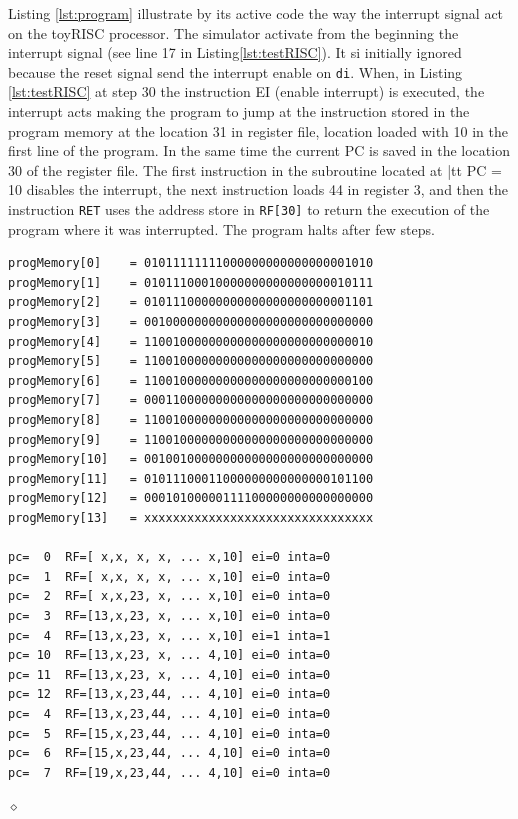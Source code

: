 \begin{exemplu}
Listing \ref{lst:program}  illustrate by its active code the way the interrupt signal act on the toyRISC processor. The simulator activate from the beginning the interrupt signal (see line 17 in Listing\ref{lst:testRISC}). It si initially ignored because the reset signal send  the interrupt enable on {\tt di}. When, in Listing \ref{lst:testRISC} at step 30 the instruction EI (enable interrupt) is executed, the interrupt acts making the program to jump at the instruction stored in the program memory at the location 31 in register file, location loaded with 10 in the first line of the program. In the same time the current PC is saved in the location 30 of the register file. The first instruction in the subroutine located at {|tt PC = 10} disables the interrupt, the next instruction  loads 44 in register 3, and then the instruction {\tt RET} uses the address store in {\tt RF[30]} to return the execution of the program where it was interrupted. The program halts after few steps.
{\small
\begin{verbatim}
progMemory[0]    = 01011111111000000000000000001010
progMemory[1]    = 01011100010000000000000000010111
progMemory[2]    = 01011100000000000000000000001101
progMemory[3]    = 00100000000000000000000000000000
progMemory[4]    = 11001000000000000000000000000010
progMemory[5]    = 11001000000000000000000000000000
progMemory[6]    = 11001000000000000000000000000100
progMemory[7]    = 00011000000000000000000000000000
progMemory[8]    = 11001000000000000000000000000000
progMemory[9]    = 11001000000000000000000000000000
progMemory[10] 	 = 00100100000000000000000000000000
progMemory[11] 	 = 01011100011000000000000000101100
progMemory[12] 	 = 00010100000111100000000000000000
progMemory[13] 	 = xxxxxxxxxxxxxxxxxxxxxxxxxxxxxxxx

pc=  0  RF=[ x,x, x, x, ... x,10] ei=0 inta=0
pc=  1  RF=[ x,x, x, x, ... x,10] ei=0 inta=0
pc=  2  RF=[ x,x,23, x, ... x,10] ei=0 inta=0
pc=  3  RF=[13,x,23, x, ... x,10] ei=0 inta=0
pc=  4  RF=[13,x,23, x, ... x,10] ei=1 inta=1
pc= 10  RF=[13,x,23, x, ... 4,10] ei=0 inta=0
pc= 11  RF=[13,x,23, x, ... 4,10] ei=0 inta=0
pc= 12  RF=[13,x,23,44, ... 4,10] ei=0 inta=0
pc=  4  RF=[13,x,23,44, ... 4,10] ei=0 inta=0
pc=  5  RF=[15,x,23,44, ... 4,10] ei=0 inta=0
pc=  6  RF=[15,x,23,44, ... 4,10] ei=0 inta=0
pc=  7  RF=[19,x,23,44, ... 4,10] ei=0 inta=0
\end{verbatim}
} 

$\diamond$
\end{exemplu}

